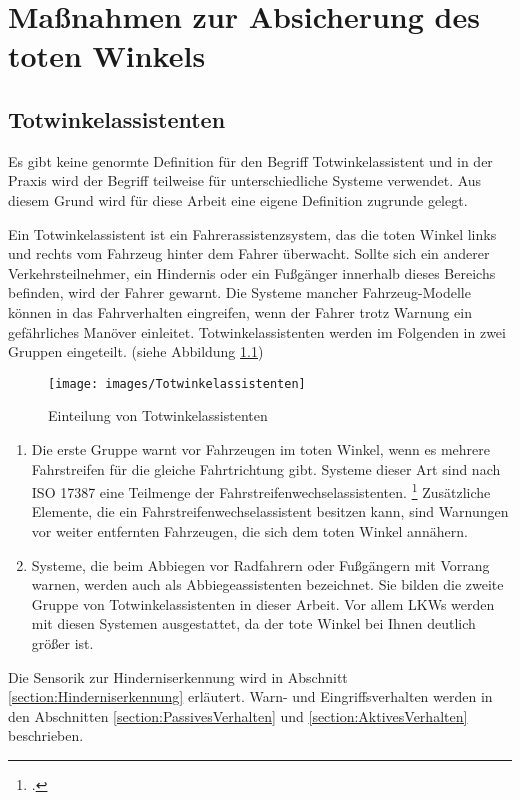 \chapter{Maßnahmen zur Absicherung des toten Winkels}
	\section{Totwinkelassistenten}
		Es gibt keine genormte Definition für den Begriff Totwinkelassistent und in der Praxis wird der Begriff teilweise für unterschiedliche Systeme verwendet. Aus diesem Grund wird für diese Arbeit eine eigene Definition zugrunde gelegt.
		
		Ein Totwinkelassistent ist ein Fahrerassistenzsystem, das die toten Winkel links und rechts vom Fahrzeug hinter dem Fahrer überwacht. Sollte sich ein anderer Verkehrsteilnehmer, ein Hindernis oder ein Fußgänger innerhalb dieses Bereichs befinden, wird der Fahrer gewarnt. Die Systeme mancher Fahrzeug-Modelle können in das Fahrverhalten eingreifen, wenn der Fahrer trotz Warnung ein gefährliches Manöver einleitet. Totwinkelassistenten werden im Folgenden in zwei Gruppen eingeteilt. (siehe Abbildung \ref{fig:totwinkelassistenten})
		\begin{figure}
			\centering
			\texttt{[image: images/Totwinkelassistenten]}
			\caption{Einteilung von Totwinkelassistenten}
			\label{fig:totwinkelassistenten}
		\end{figure}
		
		\begin{enumerate}
			\item Die erste Gruppe warnt vor Fahrzeugen im toten Winkel, wenn es mehrere Fahrstreifen für die gleiche Fahrtrichtung gibt. Systeme dieser Art sind nach ISO 17387 eine Teilmenge der Fahrstreifenwechselassistenten. \footcite[Vgl.][S. 962]{Winner2015Fahrerassistenz} Zusätzliche Elemente, die ein Fahrstreifenwechselassistent besitzen kann, sind Warnungen vor weiter entfernten Fahrzeugen, die sich dem toten Winkel annähern. 
			\item Systeme, die beim Abbiegen vor Radfahrern oder Fußgängern mit Vorrang warnen, werden auch als Abbiegeassistenten bezeichnet. Sie bilden die zweite Gruppe von Totwinkelassistenten in dieser Arbeit. Vor allem LKWs werden mit diesen Systemen ausgestattet, da der tote Winkel bei Ihnen deutlich größer ist.
		\end{enumerate}
		Die Sensorik zur Hinderniserkennung wird in Abschnitt \ref{section:Hinderniserkennung} erläutert. Warn- und Eingriffsverhalten werden in den Abschnitten \ref{section:PassivesVerhalten} und \ref{section:AktivesVerhalten} beschrieben.
